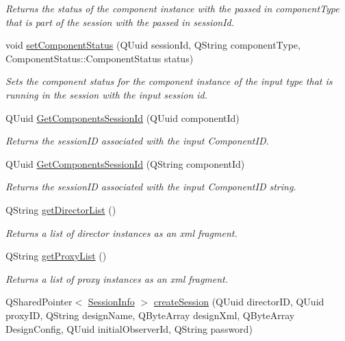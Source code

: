 \begin{DoxyCompactItemize}
\begin{DoxyCompactList}\small\item\em Returns the status of the component instance with the passed in component\-Type that is part of the session with the passed in session\-Id. \end{DoxyCompactList}\item 
void \hyperlink{class_connection_manager_a8622ab351976620118e4effc54522291}{set\-Component\-Status} (Q\-Uuid session\-Id, Q\-String component\-Type, Component\-Status\-::\-Component\-Status status)
\begin{DoxyCompactList}\small\item\em Sets the component status for the component instance of the input type that is running in the session with the input session id. \end{DoxyCompactList}\item 
Q\-Uuid \hyperlink{class_connection_manager_a05d82ba38c7e11e4a23bcd5749713e2f}{Get\-Components\-Session\-Id} (Q\-Uuid component\-Id)
\begin{DoxyCompactList}\small\item\em Returns the session\-I\-D associated with the input Component\-I\-D. \end{DoxyCompactList}\item 
Q\-Uuid \hyperlink{class_connection_manager_a99e60a314f4bce6953499ba2375fcd14}{Get\-Components\-Session\-Id} (Q\-String component\-Id)
\begin{DoxyCompactList}\small\item\em Returns the session\-I\-D associated with the input Component\-I\-D string. \end{DoxyCompactList}\item 
Q\-String \hyperlink{class_connection_manager_aa5d9b89543c27e9640f3544150a0f31b}{get\-Director\-List} ()
\begin{DoxyCompactList}\small\item\em Returns a list of director instances as an xml fragment. \end{DoxyCompactList}\item 
Q\-String \hyperlink{class_connection_manager_aad3eaf716a61bdfb93caaf68eb46cf14}{get\-Proxy\-List} ()
\begin{DoxyCompactList}\small\item\em Returns a list of proxy instances as an xml fragment. \end{DoxyCompactList}\item 
Q\-Shared\-Pointer$<$ \hyperlink{class_session_info}{Session\-Info} $>$ \hyperlink{class_connection_manager_aa0e821de2a8b6578a121ba64e999b7e5}{create\-Session} (Q\-Uuid director\-I\-D, Q\-Uuid proxy\-I\-D, Q\-String design\-Name, Q\-Byte\-Array design\-Xml, Q\-Byte\-Array Design\-Config, Q\-Uuid initial\-Observer\-Id, Q\-String password)

\end{DoxyCompactItemize}
